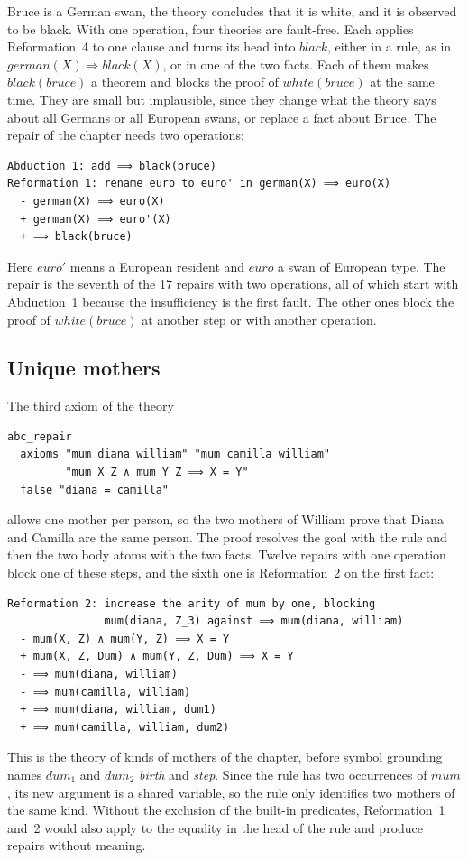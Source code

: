 \documentclass[preprint,12pt]{elsarticle}
\newcommand{\imp}{\Longrightarrow}
\begin{document}
Bruce is a German swan, the theory concludes that it is white, and it is
observed to be black. With one operation, four theories are fault-free.
Each applies Reformation~4 to one clause and turns its head into
$\mathit{black}$, either in a rule, as in
$\mathit{german}(X) \imp \mathit{black}(X)$, or in one of the two facts.
Each of them makes $\mathit{black}(\mathit{bruce})$ a theorem and blocks
the proof of $\mathit{white}(\mathit{bruce})$ at the same time. They are
small but implausible, since they change what the theory says about all
Germans or all European swans, or replace a fact about Bruce. The repair of the
chapter needs two operations:
\begin{lstlisting}[language=Out]
Abduction 1: add ⟹ black(bruce)
Reformation 1: rename euro to euro' in german(X) ⟹ euro(X)
  - german(X) ⟹ euro(X)
  + german(X) ⟹ euro'(X)
  + ⟹ black(bruce)
\end{lstlisting}
Here $\mathit{euro}'$ means a European resident and $\mathit{euro}$ a swan
of European type. The repair is the seventh of the 17 repairs with two
operations, all of which start with Abduction~1 because the insufficiency
is the first fault. The other ones block the proof of
$\mathit{white}(\mathit{bruce})$ at another step or with another operation.

\subsection{Unique mothers}
\label{sec:mothers}

The third axiom of the theory
\begin{lstlisting}
abc_repair
  axioms "mum diana william" "mum camilla william"
         "mum X Z ∧ mum Y Z ⟹ X = Y"
  false "diana = camilla"
\end{lstlisting}
allows one mother per person, so the two mothers of William prove that
Diana and Camilla are the same person. The proof resolves the goal with the
rule and then the two body atoms with the two facts. Twelve repairs with one
operation block one of these steps, and the sixth one is Reformation~2 on
the first fact:
\begin{lstlisting}[language=Out]
Reformation 2: increase the arity of mum by one, blocking
               mum(diana, Z_3) against ⟹ mum(diana, william)
  - mum(X, Z) ∧ mum(Y, Z) ⟹ X = Y
  + mum(X, Z, Dum) ∧ mum(Y, Z, Dum) ⟹ X = Y
  - ⟹ mum(diana, william)
  - ⟹ mum(camilla, william)
  + ⟹ mum(diana, william, dum1)
  + ⟹ mum(camilla, william, dum2)
\end{lstlisting}
This is the theory of kinds of mothers of the chapter, before symbol
grounding names $\mathit{dum}_1$ and $\mathit{dum}_2$ \emph{birth} and
\emph{step}. Since the rule has two occurrences of $\mathit{mum}$, its new
argument is a shared variable, so the rule only identifies two mothers of
the same kind. Without the exclusion of the built-in predicates,
Reformation~1 and~2 would also apply to the equality in the head of the
rule and produce repairs without meaning.
\end{document}
